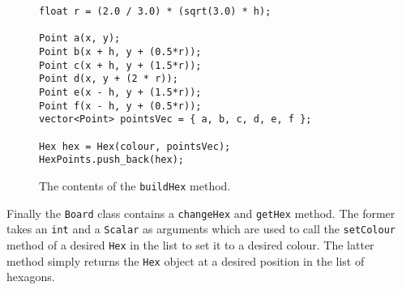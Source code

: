 \begin{figure}
\begin{lstlisting}
float r = (2.0 / 3.0) * (sqrt(3.0) * h);

Point a(x, y);
Point b(x + h, y + (0.5*r));
Point c(x + h, y + (1.5*r));
Point d(x, y + (2 * r));
Point e(x - h, y + (1.5*r));
Point f(x - h, y + (0.5*r));
vector<Point> pointsVec = { a, b, c, d, e, f };

Hex hex = Hex(colour, pointsVec);
HexPoints.push_back(hex);
\end{lstlisting}
\caption{The contents of the \texttt{buildHex} method. \label{fig:buildHexMethod}}
\end{figure}

Finally the \texttt{Board} class contains a \texttt{changeHex} and \texttt{getHex} method. The former takes an \texttt{int} and a \texttt{Scalar} as arguments which are used to call the \texttt{setColour} method of a desired \texttt{Hex} in the list to set it to a desired colour. The latter method simply returns the \texttt{Hex} object at a desired position in the list of hexagons.

